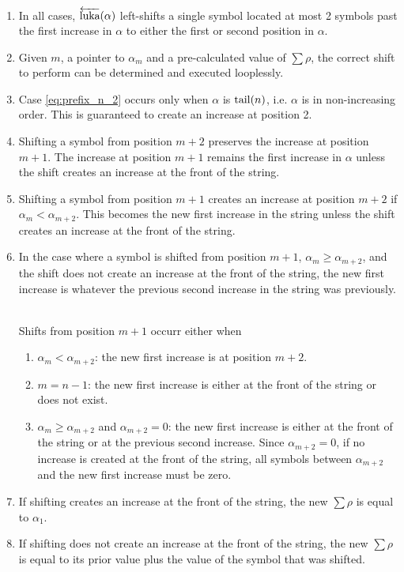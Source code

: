 \begin{enumerate}
    \item In all cases, $\overleftarrow{\text{luka}}(\alpha)$ left-shifts a single symbol located at most 2 symbols past the first increase in $\alpha$ to either the first or second position in $\alpha$.  
    \item Given $m$, a pointer to $\alpha_m$ and a pre-calculated value of $\sum{\rho}$, the correct shift to perform can be determined and executed looplessly.
    \item Case \eqref{eq:prefix_n_2} occurs only when $\alpha$ is $\operatorname{tail}(n)$, i.e. $\alpha$ is in non-increasing order. This is guaranteed to create an increase at position 2.

    \item Shifting a symbol from position $m+2$ preserves the increase at position $m+1$.  The increase at position $m+1$ remains the first increase in $\alpha$ unless the shift creates an increase at the front of the string.

    \item Shifting a symbol from position $m+1$ creates an increase at position $m+2$ if $\alpha_m < \alpha_{m+2}$.  This becomes the new first increase in the string unless the shift creates an increase at the front of the string.

    \item In the case where a symbol is shifted from position $m+1$, $\alpha_m \ge \alpha_{m+2}$, and the shift does not create an increase at the front of the string, the new first increase is whatever the previous second increase in the string was previously. \

Shifts from position $m+1$ occurr either when 
        \begin{enumerate}
            \item $\alpha_m < \alpha_{m+2}$: the new first increase is at position $m+2$.
            \item $m=n-1$: the new first increase is either at the front of the string or does not exist.
	    \item $\alpha_m \ge \alpha_{m+2}$ and $\alpha_{m+2} = 0$: the new first increase is either at the front of the string or at the previous second increase.  Since $\alpha_{m+2}=0$, if no increase is created at the front of the string, all symbols between $\alpha_{m+2}$ and the new first increase must be zero. \label{reasonforstack}
        \end{enumerate}
    \item If shifting creates an increase at the front of the string, the new $\sum{\rho}$ is equal to $\alpha_1$.
    \item If shifting does not create an increase at the front of the string, the new $\sum{\rho}$ is equal to its prior value plus the value of the symbol that was shifted.
         
\end{enumerate}

